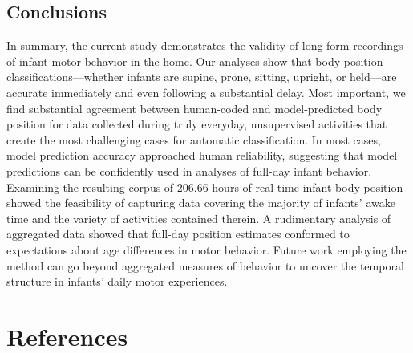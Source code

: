 \documentclass[
  man]{apa6}
\begin{document}
\hypertarget{conclusions}{%
\subsection{Conclusions}\label{conclusions}}

In summary, the current study demonstrates the validity of long-form recordings of infant motor behavior in the home. Our analyses show that body position classifications---whether infants are supine, prone, sitting, upright, or held---are accurate immediately and even following a substantial delay. Most important, we find substantial agreement between human-coded and model-predicted body position for data collected during truly everyday, unsupervised activities that create the most challenging cases for automatic classification. In most cases, model prediction accuracy approached human reliability, suggesting that model predictions can be confidently used in analyses of full-day infant behavior. Examining the resulting corpus of 206.66 hours of real-time infant body position showed the feasibility of capturing data covering the majority of infants' awake time and the variety of activities contained therein. A rudimentary analysis of aggregated data showed that full-day position estimates conformed to expectations about age differences in motor behavior. Future work employing the method can go beyond aggregated measures of behavior to uncover the temporal structure in infants' daily motor experiences.

\newpage

\hypertarget{references}{%
\section{References}\label{references}}
\end{document}
